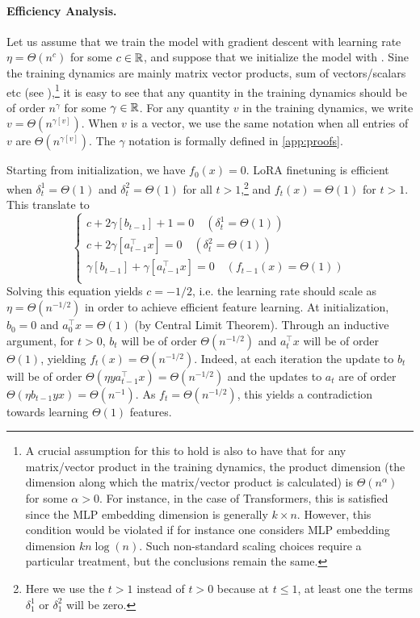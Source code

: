 \paragraph{Efficiency Analysis.} Let us assume that we train the model with gradient descent with learning rate $\eta = \Theta(n^c)$ for some $c \in \mathbb{R}$, and suppose that we initialize the model with . Sine the training dynamics are mainly matrix vector products, sum of vectors/scalars etc (see \citep{yang2022tensor}),\footnote{A crucial assumption for this to hold is also to have that for any matrix/vector product in the training dynamics, the product dimension (the dimension along which the matrix/vector product is calculated) is $\Theta(n^\alpha)$ for some $\alpha>0$. For instance, in the case of Transformers, this is satisfied since the MLP embedding dimension is generally $k \times n$. However, this condition would be violated if for instance one considers MLP embedding dimension $ k n \log(n)$. Such non-standard scaling choices require a particular treatment, but the conclusions remain the same.} it is easy to see that any quantity in the training dynamics should be of order $n^{\gamma}$ for some $\gamma \in \mathbb{R}$. For any quantity $v$ in the training dynamics, we  write $v = \Theta(n^{\gamma[v]})$. When $v$ is a vector, we use the same notation when all entries of $v$ are $\Theta(n^{\gamma[v]})$. The $\gamma$ notation is formally defined in \cref{app:proofs}. 

Starting from initialization, we have $f_0(x) = 0$. LoRA finetuning is efficient when $\delta_t^1 = \Theta(1)$ and $\delta^2_t = \Theta(1)$ for all $t>1$,\footnote{Here we use the $t>1$ instead of $t>0$ because at $t\leq 1$, at least one the terms $\delta_1^1$ or $\delta_1^2$ will be zero.} and $f_t(x) = \Theta(1)$ for $t> 1$. This translate to 
\begin{equation*}
    \begin{cases}
        c+2\gamma[b_{t-1}] + 1 = 0 \quad (\delta^1_t = \Theta(1))\\
        c + 2 \gamma[a_{t-1}^\top x] = 0\quad (\delta^2_t = \Theta(1)) \\
        \gamma[b_{t-1}] + \gamma[a_{t-1}^\top x] = 0 \quad (f_{t-1}(x) = \Theta(1))\\        
    \end{cases}
\end{equation*}
Solving this equation yields $c = -1/2$, i.e. the learning rate should scale as $\eta = \Theta(n^{-1/2})$ in order to achieve efficient feature learning. At initialization, $b_0 = 0$ and $a_0^\top x = \Theta(1)$ (by Central Limit Theorem). Through an inductive argument, for $t >0$, $b_t$ will be of order $\Theta(n^{-1/2})$ and $a_t^\top x$ will be  of order $\Theta(1)$, yielding $f_t(x) = \Theta(n^{-1/2})$. Indeed, at each iteration the update to $b_t$ will be of order $\Theta(\eta y a_{t-1}^\top x) = \Theta(n^{-1/2})$ and the updates to $a_t$ are of order $\Theta(\eta b_{t-1} y x) = \Theta(n^{-1})$. As $f_t = \Theta(n^{-1/2})$, this yields a contradiction towards learning $\Theta(1)$ features.

